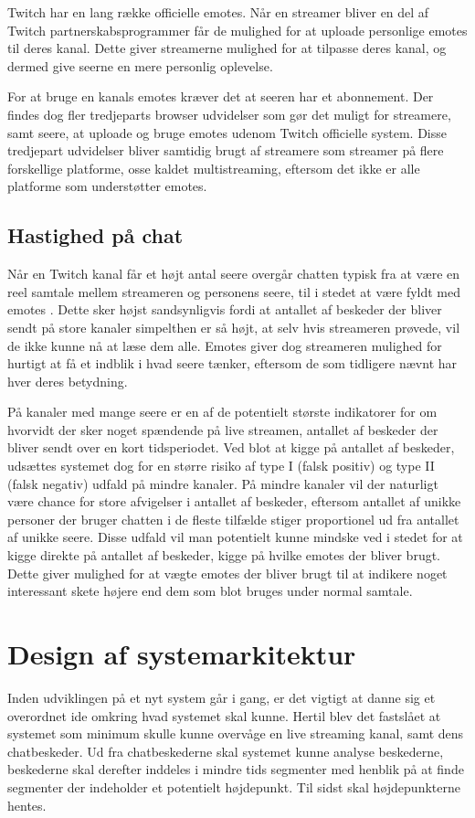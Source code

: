\documentclass{article}
\begin{document}
Twitch har en lang række officielle emotes. Når en streamer bliver en del af Twitch partnerskabsprogrammer får de mulighed for at uploade personlige emotes til deres kanal. Dette giver streamerne mulighed for at tilpasse deres kanal, og dermed give seerne en mere personlig oplevelse.

For at bruge en kanals emotes kræver det at seeren har et abonnement. Der findes dog fler tredjeparts browser udvidelser som gør det muligt for streamere, samt seere, at uploade og bruge emotes udenom Twitch officielle system. Disse tredjepart udvidelser bliver samtidig brugt af streamere som streamer på flere forskellige platforme, osse kaldet multistreaming, eftersom det ikke er alle platforme som understøtter emotes.

\subsection{Hastighed på chat}

Når en Twitch kanal får et højt antal seere overgår chatten typisk fra at være en reel samtale mellem streameren og personens seere, til i stedet at være fyldt med emotes \cite{ford_chat_2017}. Dette sker højst sandsynligvis fordi at antallet af beskeder der bliver sendt på store kanaler simpelthen er så højt, at selv hvis streameren prøvede, vil de ikke kunne nå at læse dem alle. Emotes giver dog streameren mulighed for hurtigt at få et indblik i hvad seere tænker, eftersom de som tidligere nævnt har hver deres betydning.

På kanaler med mange seere er en af de potentielt største indikatorer for om hvorvidt der sker noget spændende på live streamen, antallet af beskeder der bliver sendt over en kort tidsperiodet. Ved blot at kigge på antallet af beskeder, udsættes systemet dog for en større risiko af type I (falsk positiv) og type II (falsk negativ) udfald på mindre kanaler.
På mindre kanaler vil der naturligt være chance for store afvigelser i antallet af beskeder, eftersom antallet af unikke personer der bruger chatten i de fleste tilfælde stiger proportionel ud fra antallet af unikke seere.
Disse udfald vil man potentielt kunne mindske ved i stedet for at kigge direkte på antallet af beskeder, kigge på hvilke emotes der bliver brugt. Dette giver mulighed for at vægte emotes der bliver brugt til at indikere noget interessant skete højere end dem som blot bruges under normal samtale.

\section{Design af systemarkitektur}
Inden udviklingen på et nyt system går i gang, er det vigtigt at danne sig et overordnet ide omkring hvad systemet skal kunne. Hertil blev det fastslået at systemet som minimum skulle kunne overvåge en live streaming kanal, samt dens chatbeskeder. Ud fra chatbeskederne skal systemet kunne analyse beskederne, beskederne skal derefter inddeles i mindre tids segmenter med henblik på at finde segmenter der indeholder et potentielt højdepunkt. Til sidst skal højdepunkterne hentes.
\end{document}
